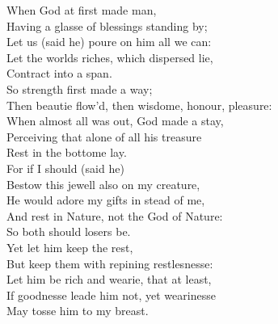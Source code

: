 \documentclass[11pt]{article}
\begin{document}
\begin{poem}
When God at first made man,\\
Having a glasse of blessings standing by;\\
Let us (said he) poure on him all we can:\\
Let the worlds riches, which dispersed lie,\\
\vin Contract into a span.\\

So strength first made a way;\\
Then beautie flow'd, then wisdome, honour, pleasure:\\
When almost all was out, God made a stay,\\
Perceiving that alone of all his treasure\\
\vin Rest in the bottome lay.\\

For if I should (said he)\\
Bestow this jewell also on my creature,\\
He would adore my gifts in stead of me,\\
And rest in Nature, not the God of Nature:\\
\vin So both should losers be.\\

Yet let him keep the rest,\\
But keep them with repining restlesnesse:\\
Let him be rich and wearie, that at least,\\
If goodnesse leade him not, yet wearinesse\\
\vin May tosse him to my breast.\\
\end{poem}
\tailpiece
\end{document}
